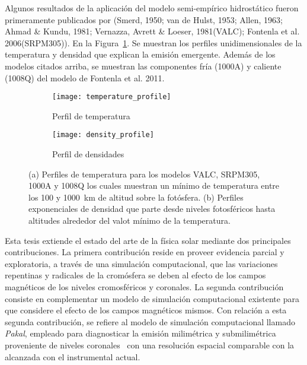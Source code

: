 Algunos resultados de la aplicaci\'on del modelo semi-emp\'irico hidrost\'atico fueron primeramente publicados por (Smerd, 1950; van de Hulst, 1953; Allen, 1963; Ahmad \& Kundu, 1981; Vernazza, Avrett \& Loeser, 1981(VALC); Fontenla et al. 2006(SRPM305)). En la Figura~\ref{semi_emp}. Se muestran los perfiles unidimensionales de la temperatura y densidad que explican la emisi\'on emergente. Adem\'as de los modelos citados arriba, se muestran las componentes fr\'ia (1000A) y caliente (1008Q) del modelo de Fontenla et al. 2011.




\begin{figure}[h!]
  \centering
  \begin{subfigure}[b]{0.4\linewidth}
    \texttt{[image: temperature\_profile]}
    \caption{Perfil de temperatura}
  \end{subfigure}
  \begin{subfigure}[b]{0.4\linewidth}
    \texttt{[image: density\_profile]}
    \caption{Perfil de densidades}
  \end{subfigure}
  \caption{ (a) Perfiles de temperatura para los modelos VALC, SRPM305, 1000A y 1008Q los cuales muestran un m\'inimo de temperatura entre los 100 y 1000~km de altitud sobre la fot\'osfera. (b) Perfiles exponenciales de densidad que parte desde niveles fotosf\'ericos hasta altitudes alrededor del valot m\'inimo de la temperatura.}
  \label{semi_emp}
\end{figure}




Esta tesis extiende el estado del arte de la f\'isica solar mediante dos principales contribuciones. La primera contribuci\'on reside en proveer evidencia parcial y exploratoria, a trav\'es de una simulaci\'on computacional,  que las variaciones repentinas y radicales de la crom\'osfera se deben al efecto de los campos magn\'eticos de los niveles cromosf\'ericos y coronales. La segunda contribuci\'on consiste en complementar un modelo de simulaci\'on computacional existente para que considere el efecto de los campos magn\'eticos mismos. Con relaci\'on a esta segunda contribuci\'on, se refiere al modelo de simulaci\'on computacional llamado \emph{Pakal}, empleado para diagnosticar la emisi\'on milim\'etrica y submilim\'etrica proveniente de niveles coronales~\citep{2010ApJS..188..437D} con una resoluci\'on espacial comparable con la alcanzada con el instrumental actual.

